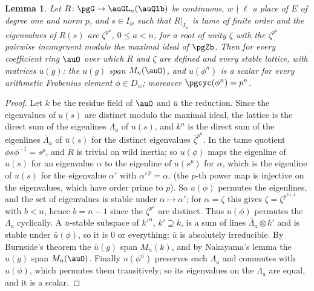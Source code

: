 \documentclass[10pt]{amsart}
\newtheorem{lemma}[theorem]{Lemma}
\theoremstyle{definition}
\theoremstyle{remark}
\begin{document}
\begin{lemma}\label{pg:burnside}
Let $R\colon\pgG\to\auGL_n(\auQlb)$ be continuous, $w\nmid\ell$ a place of $E$ of degree one and
norm $p$, and $s\in I_w$ such that $R|_{I_w}$ is tame of finite order and the eigenvalues of $R(s)$
are $\zeta^{p^a}$, $0\le a<n$, for a root of unity $\zeta$ with the $\zeta^{p^a}$ pairwise
incongruent modulo the maximal ideal of $\pgZb$. Then for every coefficient ring $\auO$ over which
$R$ and $\zeta$ are defined and every stable lattice, with matrices $u(g)$: the $u(g)$ span
$M_n(\auO)$, and $u(\phi^n)$ is a scalar for every arithmetic Frobenius element $\phi\in D_w$;
moreover $\pgcyc(\phi^n)=p^n$.
\end{lemma}
\begin{proof}
Let $k$ be the residue field of $\auO$ and $\bar u$ the reduction. Since the eigenvalues of
$u(s)$ are distinct modulo the maximal ideal, the lattice is the direct sum of the eigenlines
$\Lambda_a$ of $u(s)$, and $k^n$ is the direct sum of the eigenlines $\bar\Lambda_a$ of
$\bar u(s)$ for the distinct eigenvalues $\bar\zeta^{p^a}$. In the tame quotient $\phi
s\phi^{-1}=s^{p}$, and $R$ is trivial on wild inertia; so $u(\phi)$ maps the eigenline of $u(s)$
for an eigenvalue $\alpha$ to the eigenline of $u(s^{p})$ for $\alpha$, which is the eigenline of
$u(s)$ for the eigenvalue $\alpha'$ with $\alpha'^{\,p}=\alpha$. (the $p$-th power map is injective on the eigenvalues, which have order prime to $p$). So
$u(\phi)$ permutes the eigenlines, and the set of eigenvalues is stable under $\alpha\mapsto
\alpha'$; for $\alpha=\zeta$ this gives $\zeta=\zeta^{p^{b+1}}$ with $b<n$, hence $b=n-1$ since
the $\zeta^{p^a}$ are distinct. Thus $u(\phi)$ permutes the $\Lambda_a$ cyclically. A $\bar u$-stable
subspace of $k'^n$, $k'\supseteq k$, is a sum of lines $\bar\Lambda_a\otimes k'$ and is stable
under $\bar u(\phi)$, so it is $0$ or everything: $\bar u$ is absolutely irreducible. By Burnside's
theorem the $\bar u(g)$ span $M_n(k)$, and by Nakayama's lemma the $u(g)$ span $M_n(\auO)$.
Finally $u(\phi^n)$ preserves each $\Lambda_a$ and commutes with $u(\phi)$, which permutes them
transitively; so its eigenvalues on the $\Lambda_a$ are equal, and it is a scalar.
\end{proof}
\end{document}
